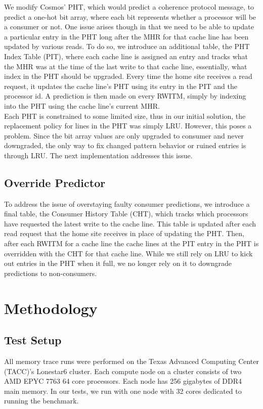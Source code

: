     We modify Cosmos' PHT, which would predict a coherence protocol message, to predict a one-hot bit array, where each bit represents whether a processor will be a consumer or not. One issue arises though in that we need to be able to update a particular entry in the PHT long after the MHR for that cache line has been updated by various reads. To do so, we introduce an additional table, the PHT Index Table (PIT), where each cache line is assigned an entry and tracks what the MHR was at the time of the last write to that cache line, essentially, what index in the PHT should be upgraded. Every time the home site receives a read request, it updates the cache line's PHT using its entry in the PIT and the processor id. A prediction is then made on every RWITM, simply by indexing into the PHT using the cache line's current MHR.\\    
    
    Each PHT is constrained to some limited size, thus in our initial solution, the replacement policy for lines in the PHT was simply LRU. However, this poses a problem. Since the bit array values are only upgraded to consumer and never downgraded, the only way to fix changed pattern behavior or ruined entries is through LRU. The next implementation addresses this issue.

    \subsection{Override Predictor}
    To address the issue of overstaying faulty consumer predictions, we introduce a final table, the Consumer History Table (CHT), which tracks which processors have requested the latest write to the cache line. This table is updated after each read request that the home site receives in place of updating the PHT. Then, after each RWITM for a cache line the cache lines at the PIT entry in the PHT is overridden with the CHT for that cache line. While we still rely on LRU to kick out entries in the PHT when it full, we no longer rely on it to downgrade predictions to non-consumers.

\section{Methodology}

    \subsection{Test Setup}
        All memory trace runs were performed on the Texas Advanced Computing Center (TACC)'s Lonestar6 cluster. Each compute node on a cluster consists of two AMD EPYC 7763 64 core processors. Each node has 256 gigabytes of DDR4 main memory. In our tests, we run with one node with 32 cores dedicated to running the benchmark. \\

